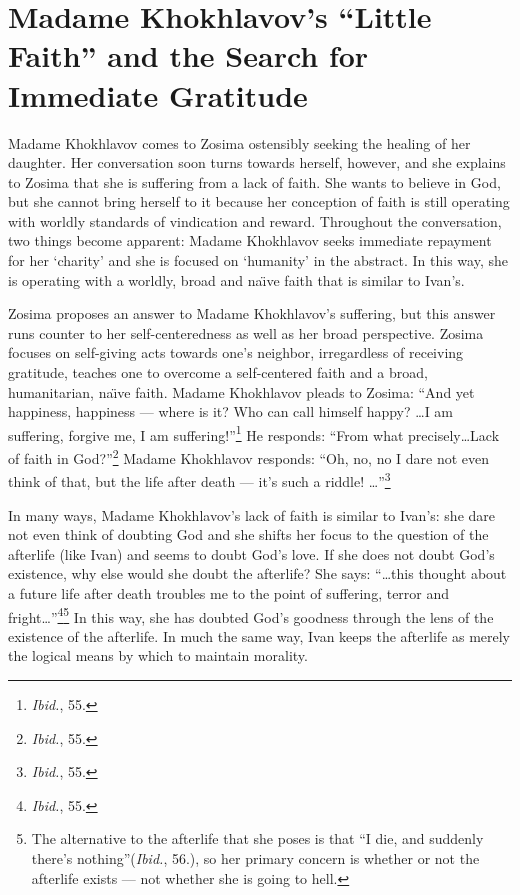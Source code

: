 \section{Madame Khokhlavov's ``Little Faith'' and the Search for Immediate Gratitude}
Madame Khokhlavov comes to Zosima ostensibly seeking the healing of her daughter. Her conversation soon turns towards herself, however, and she explains to Zosima that she is suffering from a lack of faith. She wants to believe in God, but she cannot bring herself to it because her conception of faith is still operating with worldly standards of vindication and reward. Throughout the conversation, two things become apparent: Madame Khokhlavov seeks immediate repayment for her `charity' and she is focused on `humanity' in the abstract. In this way, she is operating with a worldly, broad and na\"{\i}ve faith that is similar to Ivan's. 

Zosima proposes an answer to Madame Khokhlavov's suffering, but this answer runs counter to her self-centeredness as well as her broad perspective. Zosima focuses on self-giving acts towards one's neighbor, irregardless of receiving gratitude, teaches one to overcome a self-centered faith and a broad, humanitarian, na\"{\i}ve faith. Madame Khokhlavov pleads to Zosima: ``And yet happiness, happiness --- where is it? Who can call himself happy? \ldots I am suffering, forgive me, I am suffering!\thinspace''\footnote{\emph{Ibid.}, 55.} He responds: ``From what precisely\ldots Lack of faith in God?''\footnote{\emph{Ibid.}, 55.} Madame Khokhlavov responds: ``Oh, no, no I dare not even think of that, but the life after death --- it's such a riddle! \ldots''\footnote{\emph{Ibid.}, 55.} 

In many ways, Madame Khokhlavov's lack of faith is similar to Ivan's: she dare not even think of doubting God and she shifts her focus to the question of the afterlife (like Ivan) and seems to doubt God's love. If she does not doubt God's existence, why else would she doubt the afterlife? She says: ``\ldots this thought about a future life after death troubles me to the point of suffering, terror and fright\ldots''\footnote{\emph{Ibid.}, 55.}\thinspace\footnote{The alternative to the afterlife that she poses is that ``I die, and suddenly there's nothing''(\emph{Ibid.}, 56.), so her primary concern is whether or not the afterlife exists --- not whether she is going to hell.} In this way, she has doubted God's goodness through the lens of the existence of the afterlife. In much the same way, Ivan keeps the afterlife as merely the logical means by which to maintain morality.

